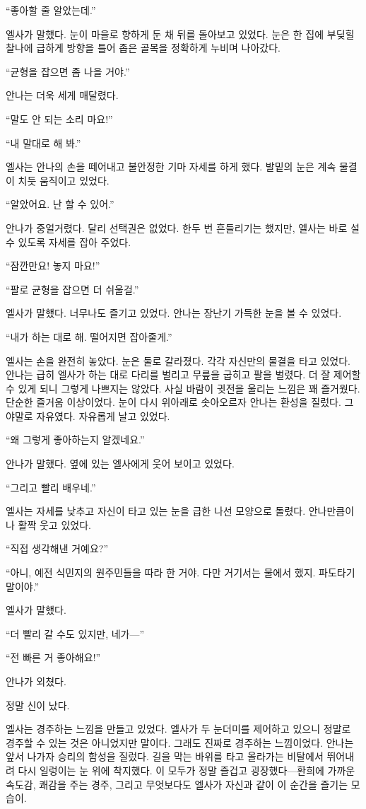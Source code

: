 ``좋아할 줄 알았는데.''

엘사가 말했다. 눈이 마을로 향하게 둔 채 뒤를 돌아보고 있었다. 눈은 한 집에 부딪힐 찰나에 급하게 방향을 틀어 좁은 골목을 정확하게 누비며 나아갔다.

``균형을 잡으면 좀 나을 거야.''

안나는 더욱 세게 매달렸다.

``말도 안 되는 소리 마요!''

``내 말대로 해 봐.''

엘사는 안나의 손을 떼어내고 불안정한 기마 자세를 하게 했다. 발밑의 눈은 계속 물결이 치듯 움직이고 있었다.

``알았어요. 난 할 수 있어.''

안나가 중얼거렸다. 달리 선택권은 없었다. 한두 번 흔들리기는 했지만, 엘사는 바로 설 수 있도록 자세를 잡아 주었다.

``잠깐만요! 놓지 마요!''

``팔로 균형을 잡으면 더 쉬울걸.''

엘사가 말했다. 너무나도 즐기고 있었다. 안나는 장난기 가득한 눈을 볼 수 있었다.

``내가 하는 대로 해. 떨어지면 잡아줄게.''

엘사는 손을 완전히 놓았다. 눈은 둘로 갈라졌다. 각각 자신만의 물결을 타고 있었다. 안나는 급히 엘사가 하는 대로 다리를 벌리고 무릎을 굽히고 팔을 벌렸다. 더 잘 제어할 수 있게 되니 그렇게 나쁘지는 않았다. 사실 바람이 귓전을 울리는 느낌은 꽤 즐거웠다. 단순한 즐거움 이상이었다. 눈이 다시 위아래로 솟아오르자 안나는 환성을 질렀다. 그야말로 자유였다. 자유롭게 날고 있었다.

``왜 그렇게 좋아하는지 알겠네요.''

안나가 말했다. 옆에 있는 엘사에게 웃어 보이고 있었다.

``그리고 빨리 배우네.''

엘사는 자세를 낮추고 자신이 타고 있는 눈을 급한 나선 모양으로 돌렸다. 안나만큼이나 활짝 웃고 있었다.

``직접 생각해낸 거예요?''

``아니, 예전 식민지의 원주민들을 따라 한 거야. 다만 거기서는 물에서 했지. 파도타기 말이야.''

엘사가 말했다.

``더 빨리 갈 수도 있지만, 네가—''

``전 빠른 거 좋아해요!''

안나가 외쳤다.

정말 신이 났다.

엘사는 경주하는 느낌을 만들고 있었다. 엘사가 두 눈더미를 제어하고 있으니 정말로 경주할 수 있는 것은 아니었지만 말이다. 그래도 진짜로 경주하는 느낌이었다. 안나는 앞서 나가자 승리의 함성을 질렀다. 길을 막는 바위를 타고 올라가는 비탈에서 뛰어내려 다시 일렁이는 눈 위에 착지했다. 이 모두가 정말 즐겁고 굉장했다—환희에 가까운 속도감, 쾌감을 주는 경주, 그리고 무엇보다도 엘사가 자신과 같이 이 순간을 즐기는 모습이.

